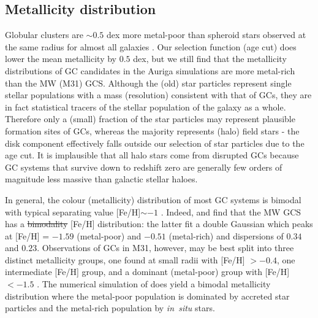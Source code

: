 \documentclass[a4paper,fleqn,usenatbib]{mnras}
\providecommand{\DIFadd}[1]{{\protect\color{blue}\uwave{#1}}} %
\providecommand{\DIFdel}[1]{{\protect\color{red}\sout{#1}}}                      %
\providecommand{\DIFaddbegin}{} %
\providecommand{\DIFaddend}{} %
\providecommand{\DIFdelbegin}{} %
\providecommand{\DIFdelend}{} %
\newcommand{\DIFscaledelfig}{0.5}
\newlength{\DIFdelgraphicswidth} %
\newlength{\DIFdelgraphicsheight} %
\newcommand{\DIFaddincludegraphics}[2][]{{\color{blue}\fbox{\DIFOincludegraphics[#1]{#2}}}} %
\newcommand{\DIFdelincludegraphics}[2][]{%
\sbox{\DIFdelgraphicsbox}{\DIFOincludegraphics[#1]{#2}}%
\settoboxwidth{\DIFdelgraphicswidth}{\DIFdelgraphicsbox} %
\settoboxtotalheight{\DIFdelgraphicsheight}{\DIFdelgraphicsbox} %
\scalebox{\DIFscaledelfig}{%
\parbox[b]{\DIFdelgraphicswidth}{\usebox{\DIFdelgraphicsbox}\\[-\baselineskip] \rule{\DIFdelgraphicswidth}{0em}}\llap{\resizebox{\DIFdelgraphicswidth}{\DIFdelgraphicsheight}{%
\setlength{\unitlength}{\DIFdelgraphicswidth}%
\begin{picture}(1,1)%
\thicklines\linethickness{2pt} %
{\color[rgb]{1,0,0}\put(0,0){\framebox(1,1){}}}%
{\color[rgb]{1,0,0}\put(0,0){\line( 1,1){1}}}%
{\color[rgb]{1,0,0}\put(0,1){\line(1,-1){1}}}%
\end{picture}%
}\hspace*{3pt}}} %
} %
\DeclareRobustCommand{\DIFaddbegin}{\DIFOaddbegin \let\includegraphics\DIFaddincludegraphics} %
\DeclareRobustCommand{\DIFaddend}{\DIFOaddend \let\includegraphics\DIFOincludegraphics} %
\DeclareRobustCommand{\DIFdelbegin}{\DIFOdelbegin \let\includegraphics\DIFdelincludegraphics} %
\DeclareRobustCommand{\DIFdelend}{\DIFOaddend \let\includegraphics\DIFOincludegraphics} %
\begin{document}
\subsection{Metallicity distribution}
\label{sec:discussion_FeH}
Globular clusters are ${\sim}0.5$ dex more metal-poor than spheroid stars observed 
at the same radius for almost all galaxies \citep{1991ARA&A..29..543H}. Our 
selection function (age cut) does lower the mean metallicity by $0.5$ dex, but
we still find that the metallicity distributions of GC candidates in the Auriga
simulations are more metal-rich than the MW (M31) GCS. Although the (old) star
particles represent single stellar populations with a mass (resolution) consistent 
with that of GCs, they are in fact statistical tracers of the stellar population 
of the galaxy as a whole. Therefore only a (small) fraction of the star particles 
may represent plausible formation sites of GCs, whereas the majority represents 
(halo) field stars - the disk component effectively falls outside our selection 
of star particles due to the age cut. It is implausible that all halo stars 
come from disrupted GCs because GC systems that survive down to redshift zero 
are generally few orders of magnitude less massive than galactic stellar haloes.

In general, the colour (metallicity) distribution of most GC systems is bimodal 
with typical separating value [Fe/H]$\sim -1$ \citep{1985ApJ...293..424Z,
1999AJ....118.1526G,2001AJ....121.2974L,2006ApJ...639...95P}. Indeed, 
\citet[][p. 234]{1998gcs..book.....A} and \citet[][p. 38]{Harris2001} find that
the MW GCS has a \DIFdelbegin \DIFdel{bimodality }\DIFdelend \DIFaddbegin \DIFadd{bimodal }\DIFaddend [Fe/H] distribution: the latter fit a double Gaussian 
which peaks at [Fe/H] = $-1.59$ (metal-poor) and $-0.51$ (metal-rich) and 
dispersions of $0.34$ and $0.23$. Observations of GCs in M31, however, may be
best split into three distinct metallicity groups, one found at small radii with 
[Fe/H] $>-0.4$, one intermediate [Fe/H] group, and a dominant (metal-poor) group 
with [Fe/H] $< -1.5$ \citep{2016ApJ...824...42C}. The numerical simulation of
\citet{2017MNRAS.465.3622R} does yield a bimodal metallicity distribution where
the metal-poor population is dominated by accreted star particles and the metal-rich
population by {\it in~situ} stars. 
\end{document}
